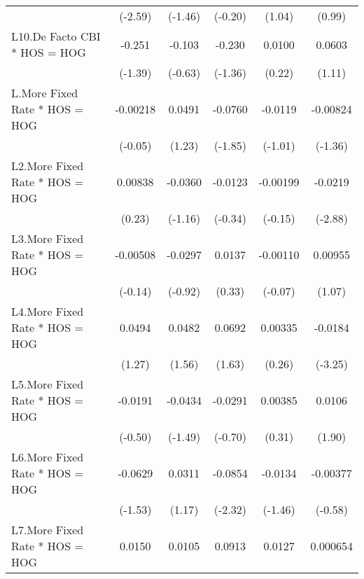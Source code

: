 {\begin{longtable}{l*{5}{c}}
                &  (-2.59)         &  (-1.46)         &  (-0.20)         &   (1.04)         &   (0.99)         \\
\addlinespace
L10.De Facto CBI * HOS = HOG&   -0.251         &   -0.103         &   -0.230         &   0.0100         &   0.0603         \\
                &  (-1.39)         &  (-0.63)         &  (-1.36)         &   (0.22)         &   (1.11)         \\
\addlinespace
L.More Fixed Rate * HOS = HOG& -0.00218         &   0.0491         &  -0.0760         &  -0.0119         & -0.00824         \\
                &  (-0.05)         &   (1.23)         &  (-1.85)         &  (-1.01)         &  (-1.36)         \\
\addlinespace
L2.More Fixed Rate * HOS = HOG&  0.00838         &  -0.0360         &  -0.0123         & -0.00199         &  -0.0219\sym{**} \\
                &   (0.23)         &  (-1.16)         &  (-0.34)         &  (-0.15)         &  (-2.88)         \\
\addlinespace
L3.More Fixed Rate * HOS = HOG& -0.00508         &  -0.0297         &   0.0137         & -0.00110         &  0.00955         \\
                &  (-0.14)         &  (-0.92)         &   (0.33)         &  (-0.07)         &   (1.07)         \\
\addlinespace
L4.More Fixed Rate * HOS = HOG&   0.0494         &   0.0482         &   0.0692         &  0.00335         &  -0.0184\sym{**} \\
                &   (1.27)         &   (1.56)         &   (1.63)         &   (0.26)         &  (-3.25)         \\
\addlinespace
L5.More Fixed Rate * HOS = HOG&  -0.0191         &  -0.0434         &  -0.0291         &  0.00385         &   0.0106         \\
                &  (-0.50)         &  (-1.49)         &  (-0.70)         &   (0.31)         &   (1.90)         \\
\addlinespace
L6.More Fixed Rate * HOS = HOG&  -0.0629         &   0.0311         &  -0.0854\sym{*}  &  -0.0134         & -0.00377         \\
                &  (-1.53)         &   (1.17)         &  (-2.32)         &  (-1.46)         &  (-0.58)         \\
\addlinespace
L7.More Fixed Rate * HOS = HOG&   0.0150         &   0.0105         &   0.0913\sym{*}  &   0.0127         & 0.000654         \\

\end{longtable}}
